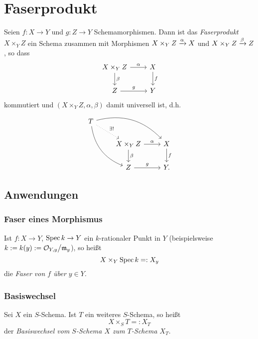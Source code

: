 \section{Faserprodukt} %

\begin{definition}[Faserprodukt]
    Seien $f: X\to Y$ und $g:Z\to Y$ Schemamorphismen.
    Dann ist das \emph{Faserprodukt} $X\times_Y Z$ ein Schema
    zusammen mit Morphismen $X\times_Y Z \xrightarrow\alpha X$ und
    $X\times_Y Z \xrightarrow\beta Z$, so dass
    \[\begin{tikzcd}
        X \times_Y Z \rar{\alpha} \dar{\beta} & X \dar{f}\\
        Z \rar{g} & Y
    \end{tikzcd}\]
    kommutiert und $(X\times_Y Z, \alpha, \beta)$ damit universell ist,
    d.h. 
    \[\begin{tikzcd}
        T \ar[bend left]{drr} \ar[bend right]{ddr} \ar[dotted]{dr}{\exists!}&\\
        &  X \times_Y Z \rar{\alpha} \dar{\beta} & X \dar{f} \\
        & Z \rar{g} & Y.
    \end{tikzcd}\]
\end{definition}

\subsection{Anwendungen}

\subsubsection{Faser eines Morphismus}
\begin{definition}
    \label{def:faser eines morphismus}
    Ist $f:X\to Y$, $\operatorname{Spec} k \to Y$ ein $k$-rationaler Punkt in $Y$ 
    (beispielsweise $k:= k(y) := \mathcal{O}_{Y,y}\big/\mathfrak{m}_y$),
    so heißt
    \[ X \times_Y \operatorname{Spec} k =: X_y\]
    die \emph{Faser von $f$ über $y\in Y$}.
\end{definition}


\subsubsection{Basiswechsel}
\begin{definition}
    \label{def:basiswechsel}
    Sei $X$ ein $S$-Schema. Ist $T$ ein weiteres $S$-Schema, so heißt
    \[X \times_S T =: X_T\]
    der \emph{Basiswechsel vom $S$-Schema $X$ zum $T$-Schema $X_T$}.
\end{definition}

